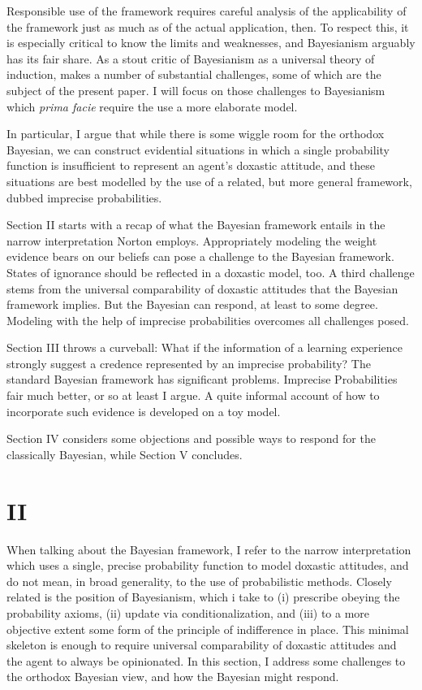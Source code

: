 \documentclass[11pt, a4paper]{scrartcl}
\begin{document}
Responsible use of the framework requires careful analysis of the applicability of the framework just as much as of the actual application, then. To respect this, it is especially critical to know the limits and weaknesses, and Bayesianism arguably has its fair share. As a stout critic of Bayesianism as a universal theory of induction, \citet{Norton2011-NORCTB} makes a number of substantial challenges, some of which are the subject of the present paper. I will focus on those challenges to Bayesianism which \emph{prima facie} require the use a more elaborate model.

In particular, I argue that while there is some wiggle room for the orthodox Bayesian, we can construct evidential situations in which a single probability function is insufficient to represent an agent's doxastic attitude, and these situations are best modelled by the use of a related, but more general framework, dubbed imprecise probabilities.

Section II starts with a recap of what the Bayesian framework entails in the narrow interpretation Norton employs. Appropriately modeling the weight evidence bears on our beliefs can pose a challenge to the Bayesian framework. States of ignorance should be reflected in a doxastic model, too. A third challenge stems from the universal comparability of doxastic attitudes that the Bayesian framework implies. But the Bayesian can respond, at least to some degree. Modeling with the help of imprecise probabilities overcomes all challenges posed.

Section III throws a curveball: What if the information of a learning experience strongly suggest a credence represented by an imprecise probability? The standard Bayesian framework has significant problems. Imprecise Probabilities fair much better, or so at least I argue. A quite informal account of how to incorporate such evidence is developed on a toy model.

Section IV considers some objections and possible ways to respond for the classically Bayesian, while Section V concludes.

\section{II}

When talking about the Bayesian framework, I refer to the narrow interpretation \citet{Norton2011-NORCTB} which uses a single, precise probability function to model doxastic attitudes, and do not mean, in broad generality, to the use of probabilistic methods. Closely related is the position of Bayesianism, which i take to (i) prescribe obeying the probability axioms, (ii) update via conditionalization, and (iii) to a more objective extent some form of the principle of indifference in place. This minimal skeleton is enough to require universal comparability of doxastic attitudes and the agent to always be opinionated. In this section, I address some challenges to the orthodox Bayesian view, and how the Bayesian might respond. 
\end{document}
